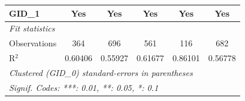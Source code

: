 \begin{table}[H]
\begin{tabular}{lccccc}
      GID\_1             & Yes                     & Yes                     & Yes                     & Yes                     & Yes\\  
      \midrule
      \emph{Fit statistics}\\
      Observations       & 364                     & 696                     & 561                     & 116                     & 682\\  
      R$^2$              & 0.60406                 & 0.55927                 & 0.61677                 & 0.86101                 & 0.56778\\  
      \midrule \midrule
      \multicolumn{6}{l}{\emph{Clustered (GID\_0) standard-errors in parentheses}}\\
      \multicolumn{6}{l}{\emph{Signif. Codes: ***: 0.01, **: 0.05, *: 0.1}}\\
   \end{tabular}
\end{table}



